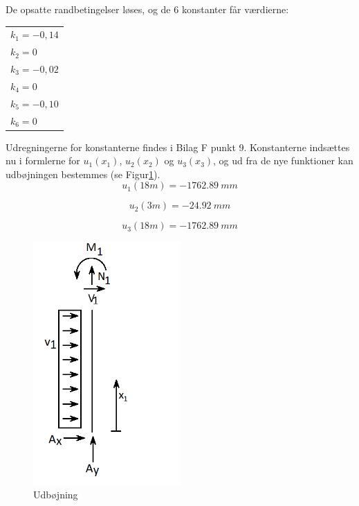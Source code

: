 De opsatte randbetingelser løses, og de 6 konstanter får værdierne: 

\begin{table}[h]
	\begin{tabular}{l}
		$k_1 = -0,\!14$       \\
		$k_2 = 0$             \\
		$k_3 = -0,\!02$       \\
		$k_4 = 0$             \\
		$k_5 = -0,\!10$       \\
		$k_6 = 0$             \\ 
	\end{tabular}
\end{table}

Udregningerne for konstanterne findes i Bilag F punkt 9.
\newline
\newline 
Konstanterne indsættes nu i formlerne for $u_1(x_1)$, $u_2(x_2)$ og $u_3(x_3)$, og ud fra de nye funktioner kan udbøjningen bestemmes (se Figur\ref{fig:udboj}).
\begin{equation}
u_1(18m) = \SI{-1762,89}{mm}
\end{equation}

\begin{equation}
u_2(3m) = \SI{-24,92}{mm}
\end{equation}

\begin{equation}
u_3(18m) = \SI{-1762,89}{mm}
\end{equation}

\begin{figure}[H]
	\centering
	\includegraphics[width=0.5\textwidth]{billeder/asnitet.png}
	\caption{Udbøjning}
	\label{fig:udboj}
\end{figure}

